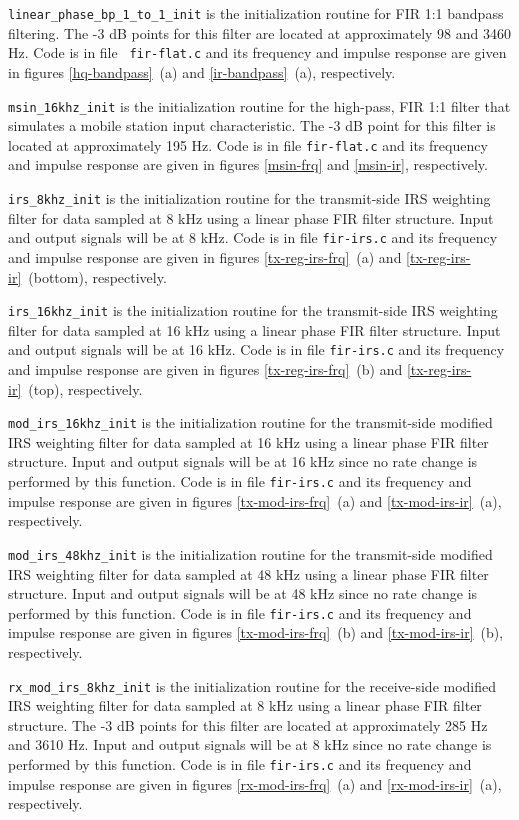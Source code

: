 {\tt linear\_phase\_bp\_1\_to\_1\_init} is the initialization routine
for FIR 1:1 bandpass filtering. The -3 dB points for this filter are
located at approximately 98 and 3460 Hz. Code is in file {\tt
fir-flat.c} and its frequency and impulse response are given in
figures \ref{hq-bandpass}~(a) and \ref{ir-bandpass}~(a), respectively.

{\tt msin\_16khz\_init} is the initialization routine for the
high-pass, FIR 1:1 filter that simulates a mobile station input
characteristic. The -3 dB point for this filter is located at
approximately 195 Hz. Code is in file {\tt fir-flat.c} and its
frequency and impulse response are given in figures \ref{msin-frq} and
\ref{msin-ir}, respectively.

{\tt irs\_8khz\_init} is the initialization routine for the
transmit-side IRS weighting filter for data sampled at 8 kHz using a
linear phase FIR filter structure. Input and output signals will be at
8 kHz. Code is in file {\tt fir-irs.c} and its frequency and impulse
response are given in figures \ref{tx-reg-irs-frq}~(a) and
\ref{tx-reg-irs-ir}~(bottom), respectively.

{\tt irs\_16khz\_init} is the initialization routine for the
transmit-side IRS weighting filter for data sampled at 16 kHz using a
linear phase FIR filter structure. Input and output signals will be at
16 kHz. Code is in file {\tt fir-irs.c} and its frequency and impulse
response are given in figures \ref{tx-reg-irs-frq}~(b) and
\ref{tx-reg-irs-ir}~(top), respectively.

{\tt mod\_irs\_16khz\_init} is the initialization routine for the
transmit-side modified IRS weighting filter for data sampled at 16 kHz
using a linear phase FIR filter structure. Input and output signals
will be at 16 kHz since no rate change is performed by this function.
Code is in file {\tt fir-irs.c} and its frequency and impulse response
are given in figures \ref{tx-mod-irs-frq}~(a) and
\ref{tx-mod-irs-ir}~(a), respectively.

{\tt mod\_irs\_48khz\_init} is the initialization routine for the
transmit-side modified IRS weighting filter for data sampled at 48 kHz
using a linear phase FIR filter structure. Input and output signals
will be at 48 kHz since no rate change is performed by this function.
Code is in file {\tt fir-irs.c} and its frequency and impulse response
are given in figures \ref{tx-mod-irs-frq}~(b) and
\ref{tx-mod-irs-ir}~(b), respectively.

{\tt rx\_mod\_irs\_8khz\_init} is the initialization routine for the
receive-side modified IRS weighting filter for data sampled at 8 kHz
using a linear phase FIR filter structure. The -3 dB points for this
filter are located at approximately 285 Hz and 3610 Hz. Input and
output signals will be at 8 kHz since no rate change is performed by
this function. Code is in file {\tt fir-irs.c} and its frequency and
impulse response are given in figures \ref{rx-mod-irs-frq}~(a) and
\ref{rx-mod-irs-ir}~(a), respectively.


